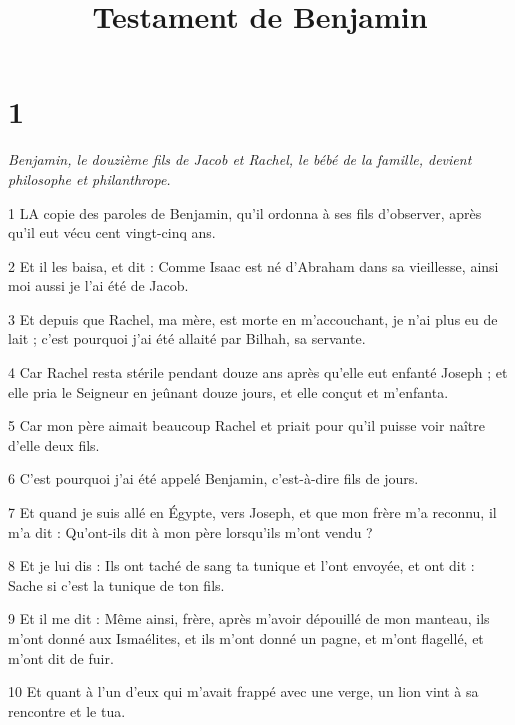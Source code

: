 

\title{Testament de Benjamin}

\chapter{1}

\par \textit{Benjamin, le douzième fils de Jacob et Rachel, le bébé de la famille, devient philosophe et philanthrope.}

\par 1 LA copie des paroles de Benjamin, qu'il ordonna à ses fils d'observer, après qu'il eut vécu cent vingt-cinq ans.

\par 2 Et il les baisa, et dit : Comme Isaac est né d'Abraham dans sa vieillesse, ainsi moi aussi je l'ai été de Jacob.

\par 3 Et depuis que Rachel, ma mère, est morte en m'accouchant, je n'ai plus eu de lait ; c'est pourquoi j'ai été allaité par Bilhah, sa servante.

\par 4 Car Rachel resta stérile pendant douze ans après qu'elle eut enfanté Joseph ; et elle pria le Seigneur en jeûnant douze jours, et elle conçut et m'enfanta.

\par 5 Car mon père aimait beaucoup Rachel et priait pour qu'il puisse voir naître d'elle deux fils.

\par 6 C'est pourquoi j'ai été appelé Benjamin, c'est-à-dire fils de jours.

\par 7 Et quand je suis allé en Égypte, vers Joseph, et que mon frère m'a reconnu, il m'a dit : Qu'ont-ils dit à mon père lorsqu'ils m'ont vendu ?

\par 8 Et je lui dis : Ils ont taché de sang ta tunique et l'ont envoyée, et ont dit : Sache si c'est la tunique de ton fils.

\par 9 Et il me dit : Même ainsi, frère, après m'avoir dépouillé de mon manteau, ils m'ont donné aux Ismaélites, et ils m'ont donné un pagne, et m'ont flagellé, et m'ont dit de fuir.

\par 10 Et quant à l'un d'eux qui m'avait frappé avec une verge, un lion vint à sa rencontre et le tua.

